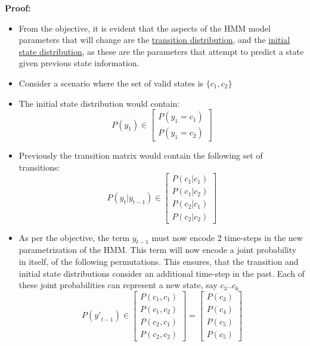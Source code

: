 \documentclass[parskip=half]{scrartcl}
\begin{document}
        \textbf{Proof:}
        \begin{itemize}
            \item 
            From the objective, it is evident that the aspects of the HMM model parameters that will change are the \underline{transition distribution}, and the \underline{initial state distribution}, as these are the parameters that attempt to predict a state given previous state information.
            \item 
            Consider a scenario where the set of valid states is $\{c_1, c_2\}$
            \item 
            The initial state distribution would contain:
            \begin{equation} \label{eqn:initial_state_dist_original}
                P(y_1) \in \begin{bmatrix} P(y_1 = c_1) \\ P(y_1 = c_2) \end{bmatrix}
            \end{equation}
            \item 
            Previously the transition matrix would contain the following set of transitions:
            \begin{equation} \label{eqn:transition_matrix_original}
                P(y_t|y_{t-1}) \in \begin{bmatrix} P(c_1|c_1) \\ P(c_1|c_2) \\ P(c_2|c_1) \\ P(c_2|c_2) \end{bmatrix}
            \end{equation}
            \item 
            As per the objective, the term $y_{t-1}$ must now encode 2 time-steps in the new parametrization of the HMM. This term will now encode a joint probability in itself, of the following permutations. This ensures, that the transition and initial state distributions consider an additional time-step in the past. Each of these joint probabilities can represent a new state, say $c_3 .. c_6$ 
            $$P({y\prime}_{t-1}) \in \begin{bmatrix} P(c_1, c_1) \\ P(c_1, c_2) \\ P(c_2, c_1) \\ P(c_2, c_2) \end{bmatrix} = \begin{bmatrix} P(c_3) \\ P(c_4) \\ P(c_5) \\ P(c_5) \end{bmatrix} $$

\end{itemize}
\end{document}
